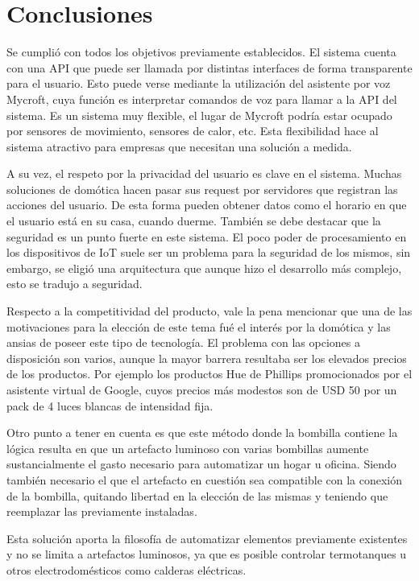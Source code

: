 \chapter{Conclusiones}

Se cumplió con todos los objetivos previamente establecidos. El sistema cuenta con una API que puede ser llamada por distintas interfaces de forma transparente para el usuario. Esto puede verse mediante la utilización del asistente por voz Mycroft, cuya función es interpretar comandos de voz para llamar a la API del sistema. Es un sistema muy flexible, el  lugar de Mycroft podría estar ocupado por sensores de movimiento, sensores de calor, etc. Esta flexibilidad hace al sistema atractivo para empresas que necesitan una solución a medida.

A su vez, el respeto por la privacidad del usuario es clave en el sistema. Muchas soluciones de domótica hacen pasar sus request por servidores que registran las acciones del usuario. De esta forma pueden obtener datos como el horario en que el usuario está en su casa, cuando duerme. También se debe destacar que la seguridad es un punto fuerte en este sistema. El poco poder de procesamiento en los dispositivos de IoT suele ser un problema para la seguridad de los mismos, sin embargo, se eligió una arquitectura que aunque hizo el desarrollo más complejo, esto se tradujo a seguridad.

Respecto a la competitividad del producto, vale la pena mencionar que una de las motivaciones para la elección de este tema fué el interés por la domótica y las ansias de poseer este tipo de tecnología. El problema con las opciones a disposición son varios, aunque la mayor barrera resultaba ser los elevados precios de los productos. Por ejemplo los productos Hue de Phillips promocionados por el asistente virtual de Google, cuyos precios más modestos son de USD 50 por un pack de 4 luces blancas de intensidad fija.

Otro punto a tener en cuenta es que este método donde la bombilla contiene la lógica resulta en que un artefacto luminoso con varias bombillas aumente sustancialmente el gasto necesario para automatizar un hogar u oficina. Siendo también necesario el que el artefacto en cuestión sea compatible con la conexión de la bombilla, quitando libertad en la elección de las mismas y teniendo que reemplazar las previamente instaladas.

Esta solución aporta la filosofía de automatizar elementos previamente existentes y no se limita a artefactos luminosos, ya que es posible controlar termotanques u otros electrodomésticos como calderas eléctricas.

